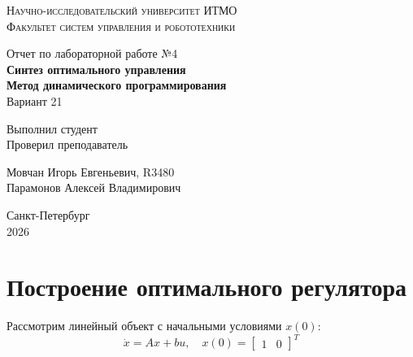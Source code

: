 \documentclass[a4paper,hidelinks,14pt]{extarticle}
\begin{document}
	\begin{titlepage}
		\setlength{\parindent}{0ex}
		
		\begin{center}
			\textsc{
				\vspace{1ex}
                Научно-исследовательский университет ИТМО \\
				\vspace{0.5ex}
				Факультет систем управления и робототехники \\
				\vspace{0.5ex}
			}
		\end{center}
		
		\vspace{45mm}
		
		\begin{center}
			Отчет по лабораторной работе №4\\
			\textbf{Синтез оптимального управления \\
			Метод динамического программирования} \\
			Вариант 21
		\end{center}
		
		\vspace{50mm}
		
		\begin{minipage}{.45\linewidth}
			Выполнил студент
            \\
			Проверил преподаватель
		\end{minipage}
		\hfill
		\begin{minipage}{.52\linewidth}
			\begin{flushright}
				Мовчан Игорь Евгеньевич, R3480
                \\
				Парамонов Алексей Владимирович
			\end{flushright}
		\end{minipage}
		
		\vfill
		\begin{center}
			Санкт-Петербург
			\\
			2026
		\end{center}
		
	\end{titlepage}

	\tableofcontents
	\clearpage
	
	\section{Построение оптимального регулятора}
	Рассмотрим линейный объект с начальными условиями $x(0)$:
	\[
		\dot{x} = Ax + bu, \quad x(0) = \begin{bmatrix}
			1 & 0
		\end{bmatrix}^T
	\]
\end{document}
